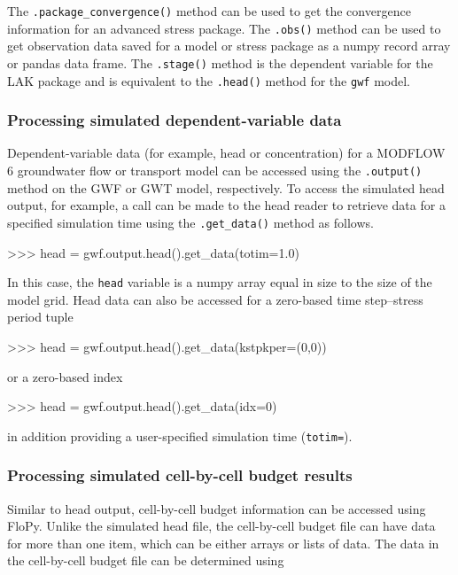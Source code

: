 \documentclass[11pt, oneside]{article}  	%
\begin{document}
\noindent The \texttt{.package\_convergence()} method can be used to get the convergence information for an advanced stress package. The \texttt{.obs()} method can be used to get observation data saved for a model or stress package as a numpy record array or pandas data frame. The \texttt{.stage()} method is the dependent variable for the LAK package and is equivalent to the \texttt{.head()} method for the \texttt{gwf} model. 

\subsubsection{Processing simulated dependent-variable data}

Dependent-variable data (for example, head or concentration) for a MODFLOW 6 groundwater flow or transport model can be accessed using the \texttt{.output()} method on the GWF or GWT model, respectively. To access the simulated head output, for example, a call can be made to the head reader to retrieve data for a specified simulation time using the \texttt{.get\_data()} method as follows.

\begin{python}
>>> head = gwf.output.head().get_data(totim=1.0)
\end{python}

\noindent In this case, the \texttt{head} variable is a numpy array equal in size to the size of the model grid. Head data can also be accessed for a zero-based time step--stress period tuple 

\begin{python}
>>> head = gwf.output.head().get_data(kstpkper=(0,0))
\end{python}

\noindent or a zero-based index

\begin{python}
>>> head = gwf.output.head().get_data(idx=0)
\end{python}

\noindent in addition providing a user-specified simulation time (\texttt{totim=}). 

\subsubsection{Processing simulated cell-by-cell budget results}

Similar to head output, cell-by-cell budget information can be accessed using FloPy. Unlike the simulated head file, the cell-by-cell budget file can have data for more than one item, which can be either arrays or lists of data. The data in the cell-by-cell budget file can be determined using
\end{document}
